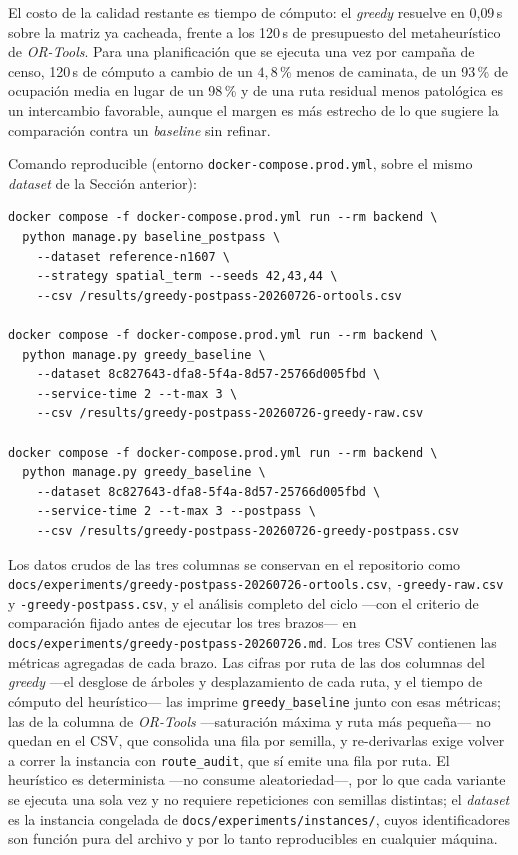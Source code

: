 El costo de la calidad restante es tiempo de cómputo: el \textit{greedy} resuelve
en 0{,}09\,s sobre la matriz ya cacheada, frente a los 120\,s de presupuesto del
metaheurístico de \textit{OR-Tools}. Para una planificación que se ejecuta una vez
por campaña de censo, 120\,s de cómputo a cambio de un $4{,}8$\,\% menos de
caminata, de un 93\,\% de ocupación media en lugar de un 98\,\% y de una ruta
residual menos patológica es un intercambio favorable, aunque el margen es más
estrecho de lo que sugiere la comparación contra un \textit{baseline} sin
refinar.

Comando reproducible (entorno \texttt{docker-compose.prod.yml}, sobre el mismo
\textit{dataset} de la Sección anterior):

\begin{verbatim}
docker compose -f docker-compose.prod.yml run --rm backend \
  python manage.py baseline_postpass \
    --dataset reference-n1607 \
    --strategy spatial_term --seeds 42,43,44 \
    --csv /results/greedy-postpass-20260726-ortools.csv

docker compose -f docker-compose.prod.yml run --rm backend \
  python manage.py greedy_baseline \
    --dataset 8c827643-dfa8-5f4a-8d57-25766d005fbd \
    --service-time 2 --t-max 3 \
    --csv /results/greedy-postpass-20260726-greedy-raw.csv

docker compose -f docker-compose.prod.yml run --rm backend \
  python manage.py greedy_baseline \
    --dataset 8c827643-dfa8-5f4a-8d57-25766d005fbd \
    --service-time 2 --t-max 3 --postpass \
    --csv /results/greedy-postpass-20260726-greedy-postpass.csv
\end{verbatim}

\begin{sloppypar}
Los datos crudos de las tres columnas se conservan en el repositorio como
\texttt{docs/experiments/greedy-postpass-20260726-ortools.csv},
\texttt{-greedy-raw.csv} y \texttt{-greedy-postpass.csv}, y el análisis completo
del ciclo ---con el criterio de comparación fijado antes de ejecutar los tres
brazos--- en \texttt{docs/experiments/greedy-postpass-20260726.md}. Los tres CSV
contienen las métricas agregadas de cada brazo. Las cifras por ruta de las dos
columnas del \textit{greedy} ---el desglose de árboles y desplazamiento de cada
ruta, y el tiempo de cómputo del heurístico--- las imprime \texttt{greedy\_baseline}
junto con esas métricas; las de la columna de \textit{OR-Tools} ---saturación
máxima y ruta más pequeña--- no quedan en el CSV, que consolida una fila por
semilla, y re-derivarlas exige volver a correr la instancia con
\texttt{route\_audit}, que sí emite una fila por ruta. El heurístico es
determinista ---no consume aleatoriedad---, por lo que cada variante se ejecuta
una sola vez y no requiere repeticiones con semillas distintas; el
\textit{dataset} es la instancia congelada de
\texttt{docs/experiments/instances/}, cuyos identificadores son función pura del
archivo y por lo tanto reproducibles en cualquier máquina.
\end{sloppypar}

